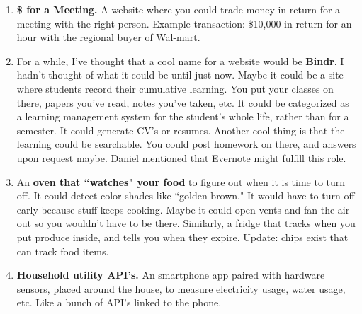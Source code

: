 \documentclass[paper=a4, fontsize=11pt]{scrartcl} %
\numberwithin{equation}{section} %
\numberwithin{figure}{section} %
\numberwithin{table}{section} %
\begin{document}
\begin{enumerate}
\item \textbf{\$ for a Meeting.}  A website where you could trade money in return for a meeting with the right person.  Example transaction: 
\$10,000 in return for an hour with the regional buyer of Wal-mart.

\item For a while, I've thought that a cool name for a website would be \textbf{Bindr}.  I hadn't thought of what it could be until just now.  Maybe it could be a site where students record their cumulative learning.  You put your classes on there, papers you've read, notes you've taken, etc.  It could be categorized as a learning management system for the student's whole life, rather than for a semester.  It could generate CV's or resumes.  Another cool thing is that the learning could be searchable.  You could post homework on there, and answers upon request maybe.  Daniel mentioned that Evernote might fulfill this role.   

\item An \textbf{oven that ``watches" your food} to figure out when it is time to turn off.  It could detect color shades like ``golden brown."  It would have to turn off early because stuff keeps cooking.  Maybe it could open vents and fan the air out so you wouldn't have to be there.  Similarly, a fridge that tracks when you put produce inside, and tells you when they expire.  Update: chips exist that can track food items.  

\item \textbf{Household utility API's.}  An smartphone app paired with hardware sensors, placed around the house, to measure electricity usage, water usage, etc.  Like a bunch of API's linked to the phone.


%
%
%

\end{enumerate}
\end{document}
